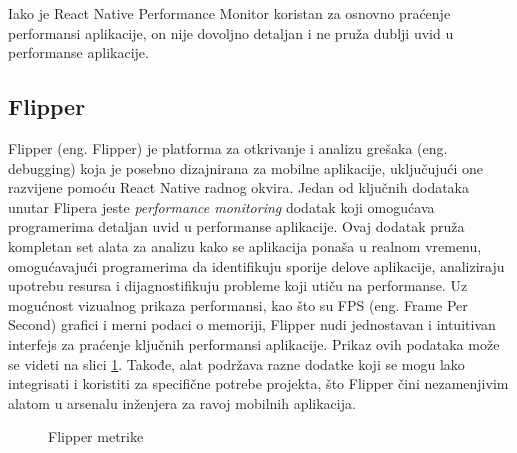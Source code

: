 \documentclass[12pt,oneside]{memoir}
\begin{document}
Iako je React Native Performance Monitor koristan za osnovno praćenje performansi aplikacije, on nije dovoljno detaljan i ne pruža dublji uvid u performanse aplikacije.

\subsection{Flipper}

Flipper\cite{Flipper} (eng. Flipper) je platforma za otkrivanje i analizu grešaka (eng. debugging) koja je posebno dizajnirana za mobilne aplikacije, uključujući one razvijene pomoću React Native radnog okvira. Jedan od ključnih dodataka unutar Flipera jeste \textit{performance monitoring} dodatak koji omogućava programerima detaljan uvid u performanse aplikacije. Ovaj dodatak pruža kompletan set alata za analizu kako se aplikacija ponaša u realnom vremenu, omogućavajući programerima da identifikuju sporije delove aplikacije, analiziraju upotrebu resursa i dijagnostifikuju probleme koji utiču na performanse. Uz mogućnost vizualnog prikaza performansi, kao što su FPS (eng. Frame Per Second) grafici i merni podaci o memoriji, Flipper nudi jednostavan i intuitivan interfejs za praćenje ključnih performansi aplikacije. Prikaz ovih podataka može se videti na slici \ref{fig:flipperMetrics}. Takođe, alat podržava razne dodatke koji se mogu lako integrisati i koristiti za specifične potrebe projekta, što Flipper čini nezamenjivim alatom u arsenalu inženjera za ravoj mobilnih aplikacija.

\begin{figure}[!h]
    \centering
    \qquad
    \caption{Flipper metrike}
    \label{fig:flipperMetrics}
\end{figure}
\end{document}
